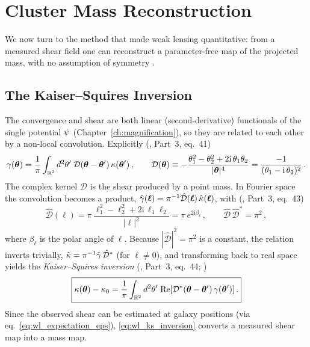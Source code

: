 \section{Cluster Mass Reconstruction}
\label{sec:wl_ks}

We now turn to the method that made weak lensing quantitative:
from a measured shear field one can reconstruct a parameter-free
map of the projected mass, with no assumption of symmetry
\citep{kaiser_squires_1993}.

\subsection{The Kaiser--Squires Inversion}

The convergence and shear are both linear (second-derivative) functionals
of the single potential $\psi$
(Chapter~\ref{ch:magnification}), so they are related to each other by a
non-local convolution.  Explicitly
(\citealp{schneider_kochanek_wambsganss_2006}, Part~3, eq.~41)
\begin{equation}
    \gamma(\boldsymbol{\theta}) = \frac{1}{\pi}\int_{\mathbb{R}^2}
    d^2\theta'\; \mathcal{D}(\boldsymbol{\theta} - \boldsymbol{\theta}')\,
    \kappa(\boldsymbol{\theta}')\,,
    \qquad
    \mathcal{D}(\boldsymbol{\theta}) \equiv
    -\frac{\theta_1^2 - \theta_2^2 + 2\mathrm{i}\,\theta_1\theta_2}
    {|\boldsymbol{\theta}|^4}
    = \frac{-1}{(\theta_1 - \mathrm{i}\,\theta_2)^2}\,.
    \label{eq:wl_ks_forward}
\end{equation}
The complex kernel $\mathcal{D}$ is the shear produced by a
point mass.  In Fourier space the convolution becomes a product,
$\hat{\gamma}(\boldsymbol\ell) = \pi^{-1}\hat{\mathcal D}(\boldsymbol\ell)\,
\hat{\kappa}(\boldsymbol\ell)$, with
(\citealp{schneider_kochanek_wambsganss_2006}, Part~3, eq.~43)
\begin{equation}
    \hat{\mathcal D}(\boldsymbol\ell)
    = \pi\,\frac{\ell_1^2 - \ell_2^2 + 2\mathrm{i}\,\ell_1\ell_2}
    {|\boldsymbol\ell|^2}
    = \pi\, e^{2\mathrm{i}\beta_\ell}\,,
    \qquad
    \hat{\mathcal D}\,\hat{\mathcal D}^* = \pi^2\,,
    \label{eq:wl_Dhat}
\end{equation}
where $\beta_\ell$ is the polar angle of $\boldsymbol\ell$.  Because
$|\hat{\mathcal D}|^2 = \pi^2$ is a constant, the relation inverts
trivially, $\hat{\kappa} = \pi^{-1}\hat{\gamma}\,\hat{\mathcal D}^*$
(for $\boldsymbol\ell \neq 0$), and transforming back to real space yields
the \emph{Kaiser--Squires inversion}
(\citealp{schneider_kochanek_wambsganss_2006}, Part~3, eq.~44;
\citealp{kaiser_squires_1993})
\begin{equation}
    \boxed{
    \kappa(\boldsymbol{\theta}) - \kappa_0
    = \frac{1}{\pi}\int_{\mathbb{R}^2} d^2\theta'\;
    \mathrm{Re}\!\left[\mathcal{D}^*(\boldsymbol{\theta} - \boldsymbol{\theta}')\,
    \gamma(\boldsymbol{\theta}')\right].
    }
    \label{eq:wl_ks_inversion}
\end{equation}
Since the observed shear can be estimated at galaxy positions
(via eq.~\ref{eq:wl_expectation_eps}), \eqref{eq:wl_ks_inversion} converts
a measured shear map into a mass map.

